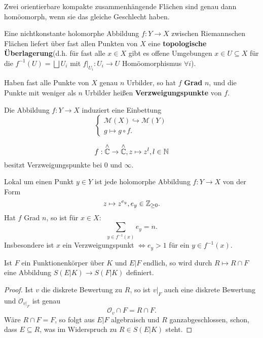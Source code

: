 \begin{theorem}
    Zwei orientierbare kompakte zusammenhängende Flächen sind genau dann homöomorph, wenn sie das gleiche Geschlecht haben.
\end{theorem}

\begin{bemerkungnr}
    Eine nichtkonstante holomorphe Abbildung $f: Y \to X$ zwischen Riemannschen Flächen liefert über fast allen Punkten von $X$ eine
    \textbf{topologische Überlagerung}(d.h. für fast alle $x \in X$ gibt es offene Umgebungen $x \in U \subseteq X$ für die
    $f^{-1}(U)=\bigsqcup U_i$ mit $f|_{U_i}: U_i \to U$ Homöomorphismus $\forall i$).

    Haben fast alle Punkte von $X$ genau $n$ Urbilder, so hat $f$ \textbf{Grad} $n$, und die Punkte mit weniger als $n$ Urbilder
    heißen \textbf{Verzweigungspunkte} von $f$.

    Die Abbildung $f: Y \to X$ induziert eine Einbettung
    $$ \begin{cases}
            \mathcal{M}(X) \hookrightarrow \mathcal{M}(Y)\\
            g \mapsto g \circ f.
        \end{cases}$$
\end{bemerkungnr}

\begin{beispiel}
    $$f : \overset{\wedge}{\mathbb{C}} \to \overset{\wedge}{\mathbb{C}}, z \mapsto z^l, l \in \mathbb{N}$$
    besitzt Verzweigungspunkte bei $0$ und $\infty$.
\end{beispiel}

\begin{bemerkungnr}
    Lokal um einen Punkt $y \in Y$ ist jede holomorphe Abbildung $f: Y \to X$ von der Form
    $$ z \mapsto z^{e_y}, e_y \in \mathbb{Z}_{\geq 0}.$$
    Hat $f$ Grad $n$, so ist für $x \in X$:
    $$ \sum\limits_{y \in f^{-1}(x)} e_y = n. $$
    Insbesondere ist $x$ ein Verzweigungspunkt $\iff e_y > 1$ für ein $y \in f^{-1}(x)$.
\end{bemerkungnr}

\begin{satz}
    Ist $F$ ein Funktionenkörper über $K$ und $E|F$ endlich, so wird durch $R \mapsto R \cap F$ eine Abbildung
    $S(E|K) \to S(F|K)$ definiert.
\end{satz}
\begin{proof}
    Ist $v$ die diskrete Bewertung zu $R$, so ist $v|_F$ auch eine diskrete Bewertung und 
    $\mathcal{O}_{v|_F}$ ist genau 
    $$ \mathcal{O}_v \cap F = R \cap F.$$
    Wäre $R\cap F = F$, so folgt aus $E|F$ algebraisch und $R$ ganzabgeschlossen, schon, dass $E \subseteq R$,
    was im Widerspruch zu $R \in S(E|K)$ steht.
\end{proof}


